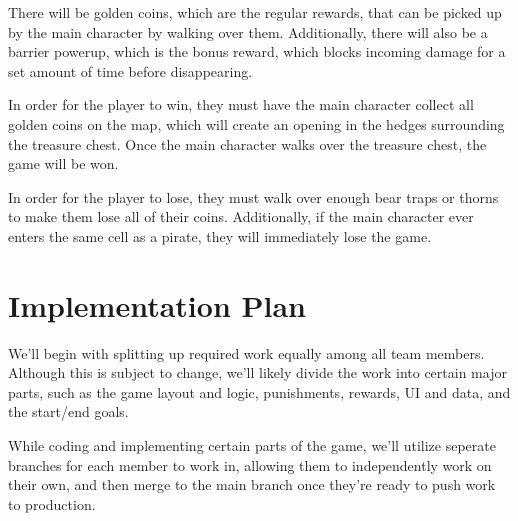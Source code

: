 \documentclass[10pt,letterpaper]{article}
\begin{document}
There will be golden coins, which are the regular rewards, that can be picked up by the main character by walking over them. Additionally,
there will also be a barrier powerup, which is the bonus reward, which blocks incoming damage for a set amount of time before disappearing.

In order for the player to win, they must have the main character collect all golden coins on the map, which will create an opening in the
hedges surrounding the treasure chest. Once the main character walks over the treasure chest, the game will be won.

In order for the player to lose, they must walk over enough bear traps or thorns to make them lose all of their coins. Additionally,
if the main character ever enters the same cell as a pirate, they will immediately lose the game.

\section{Implementation Plan}

We'll begin with splitting up required work equally among all team members. Although this is subject to change, we'll likely
divide the work into certain major parts, such as the game layout and logic, punishments, rewards, UI and data, and the start/end goals.

While coding and implementing certain parts of the game, we'll utilize seperate branches for each member to work in, allowing them
to independently work on their own, and then merge to the main branch once they're ready to push work to production.
\end{document}
